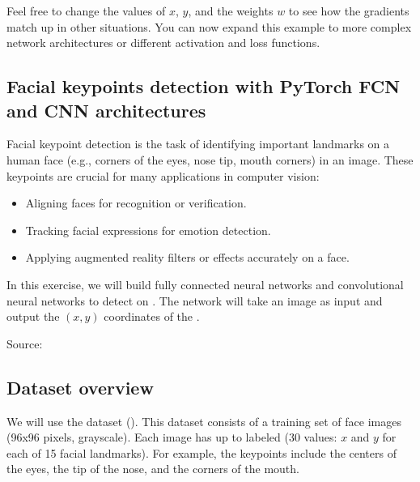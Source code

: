 \documentclass[letterpaper,10pt,english]{jupyterBook}
\begin{document}
\sphinxAtStartPar
Feel free to change the values of \(x\), \(y\), and the weights \(w\) to see how the gradients match up in other situations.
You can now expand this example to more complex network architectures or different activation and loss functions.


\subsection{Facial keypoints detection with PyTorch FCN and CNN architectures}
\label{\detokenize{04:facial-keypoints-detection-with-pytorch-fcn-and-cnn-architectures}}
\sphinxAtStartPar
Facial keypoint detection is the task of identifying important landmarks on a human face (e.g., corners of the eyes, nose tip, mouth corners) in an image. These keypoints are crucial for many applications in computer vision:
\begin{itemize}
\item {} 
\sphinxAtStartPar
Aligning faces for recognition or verification.

\item {} 
\sphinxAtStartPar
Tracking facial expressions for emotion detection.

\item {} 
\sphinxAtStartPar
Applying augmented reality filters or effects accurately on a face.

\end{itemize}

\sphinxAtStartPar
In this exercise, we will build fully connected neural networks and convolutional neural networks to detect  on . The network will take an image as input and output the \( (x,y) \) coordinates of the .

\sphinxAtStartPar
Source: 


\subsection{Dataset overview}
\label{\detokenize{04:dataset-overview}}
\sphinxAtStartPar
We will use the  dataset (). This dataset consists of a training set of  face images (96x96 pixels, grayscale). Each image has up to  labeled (30 values: \( x \) and \( y \) for each of 15 facial landmarks). For example, the keypoints include the centers of the eyes, the tip of the nose, and the corners of the mouth.
\end{document}
